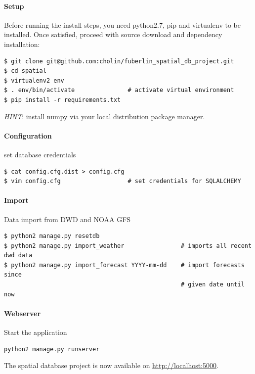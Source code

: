 \documentclass{scrartcl}
\begin{document}
\paragraph{Setup}
Before running the install steps, you need python2.7, pip  and virtualenv to be installed. Once satisfied, proceed with source download and dependency installation:
\begin{verbatim}
$ git clone git@github.com:cholin/fuberlin_spatial_db_project.git
$ cd spatial
$ virtualenv2 env
$ . env/bin/activate               # activate virtual environment
$ pip install -r requirements.txt
\end{verbatim}

\textit{HINT}: install numpy via your local distribution package manager.

\paragraph{Configuration} set database credentials

\begin{verbatim}
$ cat config.cfg.dist > config.cfg
$ vim config.cfg                   # set credentials for SQLALCHEMY
\end{verbatim}

\paragraph{Import}
Data import from DWD and NOAA GFS
\begin{verbatim}
$ python2 manage.py resetdb
$ python2 manage.py import_weather                # imports all recent dwd data
$ python2 manage.py import_forecast YYYY-mm-dd    # import forecasts since
                                                  # given date until now
\end{verbatim}


\paragraph{Webserver}
Start the application
\begin{verbatim}
python2 manage.py runserver
\end{verbatim}

The spatial database project is now available on \url{http://localhost:5000}.

\vspace{1cm}
\end{document}
